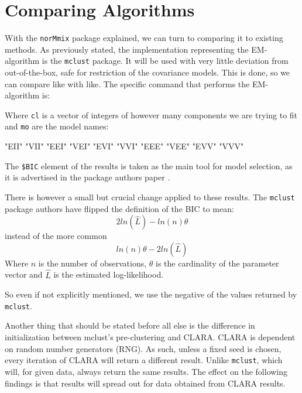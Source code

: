 \chapter{Comparing Algorithms}


With the {\tt norMmix} package explained, we can turn to comparing it to 
existing methods. As previously stated, the implementation representing the 
EM-algorithm is the {\tt mclust} package. It will be used with very little 
deviation from out-of-the-box, safe for restriction of the covariance models.
This is done, so we can compare like with like.
The specific command that performs the EM-algorithm is:

\begin{Schunk}
\end{Schunk}

Where {\tt cl} is a vector of integers of however many components we are trying 
to fit and {\tt mo} are the model names:

\begin{Schunk}
\begin{Soutput}
 [1] "EII" "VII" "EEI" "VEI" "EVI" "VVI" "EEE" "VEE" "EVV" "VVV"
\end{Soutput}
\end{Schunk}

The {\tt \$BIC} element of the results is taken as the main tool for model 
selection, as it is advertised in the package authors paper \cite{Scr16}.

There is however a small but crucial change applied to these results.
The {\tt mclust} package authors have flipped the definition of the BIC to mean:
\begin{equation} 
    2 ln(\hat{L}) - ln(n) \theta
\end{equation}
instead of the more common
\begin{equation} 
    ln(n) \theta - 2 ln(\hat{L})
\end{equation}
Where $n$ is the number of observations, $\theta$ is the cardinality of the 
parameter vector and $$ is the estimated log-likelihood.

So even if not explicitly mentioned, we use the negative of the values returned
by {\tt mclust}.

Another thing that should be stated before all else is the difference in 
initialization between {mclust}'s pre-clustering and CLARA. CLARA is dependent
on random number generators (RNG). As such, unless a fixed seed is chosen, 
every iteration of CLARA will return a different result. Unlike {\tt mclust}, 
which will, for given data, always return the same results. The effect on the 
following findings is that results will spread out for data obtained from 
CLARA results.


